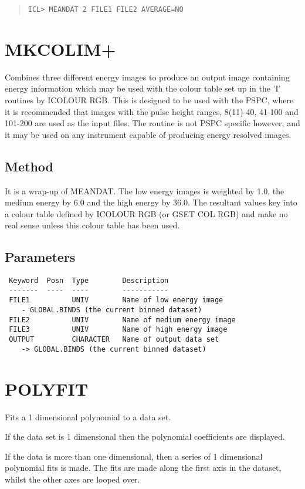 \documentclass{book}
\renewcommand{\_}{{\tt\char'137}}     %
\begin{document}
\begin{quote}\begin{verbatim}
ICL> MEANDAT 2 FILE1 FILE2 AVERAGE=NO
\end{verbatim}\end{quote}
\section{MKCOLIM+}
Combines three different energy images to produce an output image
containing energy information which may be used with the colour
table set up in the 'I' routines by ICOLOUR RGB. This is designed to
be used with the PSPC, where it is recommended that images with the
pulse height ranges, 8(11)-40, 41-100 and 101-200 are used as the
input files. The routine is not PSPC specific however, and it may
be used on any instrument capable of producing energy resolved images.

\subsection{Method}
It is a wrap-up of MEANDAT. The low energy images is weighted by 1.0,
the medium energy by 6.0 and the high energy by 36.0. The resultant
values key into a colour table defined by ICOLOUR RGB (or GSET COL RGB)
and make no real sense unless this colour table has been used.

\subsection{Parameters}
\begin{verbatim}
 Keyword  Posn  Type        Description
 -------  ----  ----        -----------
 FILE1          UNIV        Name of low energy image
    - GLOBAL.BINDS (the current binned dataset)
 FILE2          UNIV        Name of medium energy image
 FILE3          UNIV        Name of high energy image
 OUTPUT         CHARACTER   Name of output data set
    -> GLOBAL.BINDS (the current binned dataset)

\end{verbatim}\section{POLYFIT}
Fits a 1 dimensional polynomial to a data set.

If the data set is 1 dimensional then the polynomial coefficients
are displayed.

If the data is more than one dimensional, then a series of 1
dimensional polynomial fits is made. The fits are made along the
first axis in the dataset, whilst the other axes are looped over.
\end{document}
